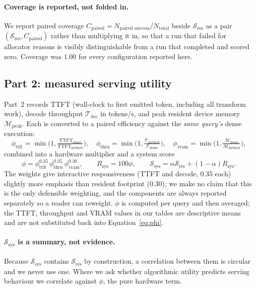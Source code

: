 \documentclass{article}
\theoremstyle{definition}
\newcommand{\Sres}{\mathcal{S}_{\text{res}}}
\newcommand{\Ssys}{\mathcal{S}_{\text{sys}}}
\begin{document}
\paragraph{Coverage is reported, not folded in.} We report paired coverage $C_{\text{paired}} = N_{\text{paired success}} / N_{\text{total}}$ beside $\Sres$ as a pair $(\Sres, C_{\text{paired}})$ rather than multiplying it in, so that a run that failed for allocator reasons is visibly distinguishable from a run that completed and scored zero. Coverage was $1.00$ for every configuration reported here.

\subsection{Part 2: measured serving utility}
\label{sec:part2}

Part~2 records TTFT (wall-clock to first emitted token, including all transform work), decode throughput $\mathcal{T}_{\text{dec}}$ in tokens/s, and peak resident device memory $\mathcal{M}_{\text{peak}}$. Each is converted to a paired efficiency against the \emph{same query's} dense execution:
\begin{equation}
\label{eq:phi_components}
\phi_{\text{ttft}} = \min\!\Big(1, \tfrac{\text{TTFT}_{\text{dense}}}{\text{TTFT}_{\text{method}}}\Big),\quad
\phi_{\text{thru}} = \min\!\Big(1, \tfrac{\mathcal{T}_{\text{method}}}{\mathcal{T}_{\text{dense}}}\Big),\quad
\phi_{\text{vram}} = \min\!\Big(1, \tfrac{\mathcal{M}_{\text{dense}}}{\mathcal{M}_{\text{method}}}\Big),
\end{equation}
combined into a hardware multiplier and a system score
\begin{equation}
\label{eq:phi}
\phi = \phi_{\text{ttft}}^{0.35}\, \phi_{\text{thru}}^{0.35}\, \phi_{\text{vram}}^{0.30}, \qquad R_{\text{sys}} = 100\phi, \qquad \Ssys = \alpha \Sres + (1-\alpha) R_{\text{sys}}.
\end{equation}
The weights give interactive responsiveness (TTFT and decode, $0.35$ each) slightly more emphasis than resident footprint ($0.30$); we make no claim that this is the only defensible weighting, and the components are always reported separately so a reader can reweight. $\phi$ is computed per query and then averaged; the TTFT, throughput and VRAM values in our tables are descriptive means and are not substituted back into Equation~\ref{eq:phi}.

\paragraph{$\Ssys$ is a summary, not evidence.} Because $\Ssys$ contains $\Sres$ by construction, a correlation between them is circular and we never use one. Where we ask whether algorithmic utility predicts serving behaviour we correlate against $\phi$, the pure hardware term.
\end{document}
